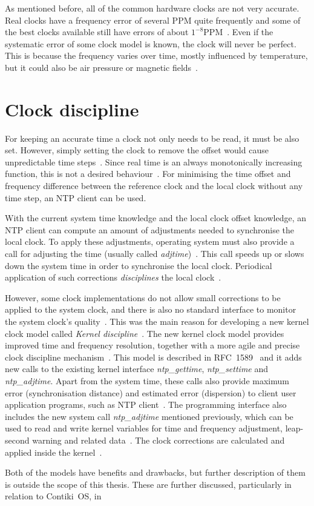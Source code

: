 As mentioned before, all of the common hardware clocks are not very accurate.
Real clocks have a frequency error of several PPM quite frequently
and some of the best clocks available still have errors of about $1^{-8}$PPM~\cite{ntp-faq}.
Even if the systematic error of some clock model is known, the clock will never be perfect.
This is because the frequency varies over time, mostly influenced by temperature,
but it could also be air pressure or magnetic fields~\cite{ntp-faq}.

\section{Clock discipline}\label{sec:system-discipline}
For keeping an accurate time a clock not only needs to be read, it must be also set.
However, simply setting the clock to remove the offset would cause unpredictable time steps~\cite{ntp-faq}.
Since real time is an always monotonically increasing function, this is not a desired behaviour~\cite{ntp-faq}.
For minimising the time offset and frequency difference between
the reference clock and the local clock without any time step, an NTP client can be used.

With the current system time knowledge and the local clock offset knowledge,
an NTP client can compute an amount of adjustments needed to synchronise the local clock.
To apply these adjustments, operating system must also provide a call
for adjusting the time (usually called {\it{adjtime}})~\cite{nanokernel}.
This call speeds up or slows down the system time in order to synchronise the local clock.
Periodical application of such corrections {\it{disciplines}} the local clock~\cite{ntp-faq}.

However, some clock implementations do not allow small corrections to be applied
to the system clock, and there is also no standard interface to monitor the system clock's quality~\cite{ntp-faq}.
This was the main reason for developing a new kernel clock model called {\it{Kernel discipline}}~\cite{nanokernel}.
The new kernel clock model provides improved time and frequency
resolution, together with a more agile and precise clock discipline mechanism~\cite{nanokernel}.
This model is described in RFC~1589~\cite{rfc1589} and it adds new calls to the existing kernel interface
{\it{ntp\_gettime}}, {\it{ntp\_settime}} and {\it{ntp\_adjtime}}.
Apart from the system time, these calls also provide maximum error (synchronisation distance)
and estimated error (dispersion) to client user application programs, such as NTP client~\cite{rfc1589}.
The programming interface also includes the new
system call {\it{ntp\_adjtime}} mentioned previously, which can be used
to read and write kernel variables for time and frequency
adjustment, leap-second warning and related data~\cite{rfc1589}.
The clock corrections are calculated and applied inside the kernel~\cite{ntp-faq}.

Both of the models have benefits and drawbacks,
but further description of them is outside the scope of this thesis.
These are further discussed, particularly in relation to Contiki~OS, in %

